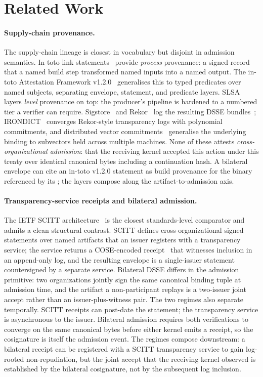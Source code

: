 \section{Related Work}

\paragraph{Supply-chain provenance.} The supply-chain lineage is closest in vocabulary but disjoint in admission semantics. In-toto link statements~\cite{torres2019intoto} provide \emph{process} provenance: a signed record that a named build step transformed named inputs into a named output. The in-toto Attestation Framework v1.2.0~\cite{intotoSpec2024} generalises this to typed predicates over named subjects, separating envelope, statement, and predicate layers. SLSA~\cite{slsa} layers \emph{level} provenance on top: the producer's pipeline is hardened to a numbered tier a verifier can require. Sigstore~\cite{sigstoreSecurity} and Rekor~\cite{rekorGithub} log the resulting DSSE bundles~\cite{dsse}; IRONDICT~\cite{hafeziIRONDICT2026} converges Rekor-style transparency logs with polynomial commitments, and distributed vector commitments~\cite{dvcUSENIX2026} generalise the underlying binding to subvectors held across multiple machines. None of these attests \emph{cross-organizational admission}: that the receiving kernel accepted this action under this treaty over identical canonical bytes including a continuation hash. A bilateral envelope can cite an in-toto v1.2.0 statement as build provenance for the binary referenced by its ; the layers compose along the artifact-to-admission axis.

\paragraph{Transparency-service receipts and bilateral admission.} The IETF SCITT architecture~\cite{scittArchitecture} is the closest standards-level comparator and admits a clean structural contrast. SCITT defines cross-organizational signed statements over named artifacts that an issuer registers with a transparency service; the service returns a COSE-encoded receipt~\cite{rfc9942} that witnesses inclusion in an append-only log, and the resulting envelope is a single-issuer statement countersigned by a separate service. Bilateral DSSE differs in the admission primitive: two organizations jointly sign the same canonical binding tuple at admission time, and the artifact a non-participant replays is a two-issuer joint accept rather than an issuer-plus-witness pair. The two regimes also separate temporally. SCITT receipts can post-date the statement; the transparency service is asynchronous to the issuer. Bilateral admission requires both verifications to converge on the same canonical bytes before either kernel emits a receipt, so the cosignature is itself the admission event. The regimes compose downstream: a bilateral receipt can be registered with a SCITT transparency service to gain log-rooted non-repudiation, but the joint accept that the receiving kernel observed is established by the bilateral cosignature, not by the subsequent log inclusion.

